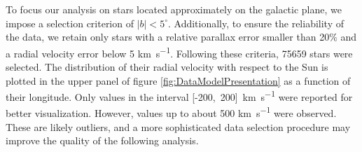 To focus our analysis on stars located approximately on the galactic plane, we impose a selection criterion of $\vert b \vert < 5^{\circ}$. 
Additionally, to ensure the reliability of the data, we retain only stars with a relative parallax error smaller than 20$\%$ 
and a radial velocity error below 5 \unit{\kilo\meter\per\second}. 
Following these criteria, 75659 stars were selected. The distribution of their radial velocity 
with respect to the Sun is plotted in the upper panel of figure \ref{fig:DataModelPresentation} 
as a function of their longitude. Only values in the interval 
[-200,~200]~\unit{\kilo\meter\per\second} were reported for better visualization. 
However, values up to about 500 \unit{\kilo\meter\per\second} were observed. 
These are likely outliers, and a more sophisticated data selection procedure may improve the quality of the following analysis.

